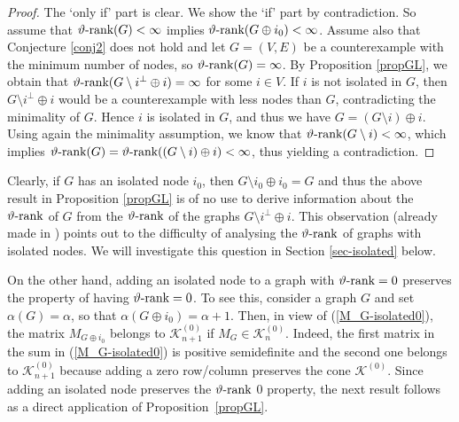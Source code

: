 \documentclass[11pt]{article}
\numberwithin{equation}{section}
\newcommand{\MK}{{\mathcal K}}
\newcommand{\rrank}{\vartheta\text{\rm -rank}}
\begin{document}
\begin{proof}
The `only if' part is clear. We show the `if' part by contradiction. So assume that  $\rrank(G)<\infty$ implies $\rrank(G\oplus i_0)<\infty$. Assume also  that  Conjecture \ref{conj2} does not hold and let $G=(V,E)$ be a counterexample with the minimum number of nodes, so  $\rrank(G)=\infty$. By Proposition \ref{propGL}, we obtain that $\rrank(G\setminus i ^\perp \oplus i)=\infty$ for some $i\in V$. If $i$ is not isolated in $G$, then $G\setminus i^\perp \oplus i$ would be a counterexample with less nodes than $G$,  contradicting the minimality of $G$. Hence $i$ is isolated in $G$, and thus we have $G = (G\setminus i)\oplus i$. Using again the minimality assumption, we know that $\rrank(G\setminus i)<\infty$, which implies   $\rrank(G)=\rrank((G\setminus i)\oplus i)<\infty$, thus yielding a contradiction.
\end{proof}

Clearly,  if $G$ has an isolated node $i_0$,  then $G\setminus {i_0} \oplus i_0=G$ and thus the above result in Proposition \ref{propGL} is of no use to derive information about the $\rrank$ of $G$ from the $\rrank$ of the graphs $G\setminus i^\perp \oplus i $. This observation (already made in \cite{GL2007}) points out to the difficulty of analysing the $\rrank$ of graphs with isolated nodes.  We will investigate this question in Section \ref{sec-isolated} below.

On the other hand, adding an isolated node to  a graph with $\rrank=0$  preserves the property of having $\rrank=0$.  To see this, consider a graph $G$ and set $\alpha(G)=\alpha$, so that $\alpha(G\oplus i_0)=\alpha+1$. 
Then, in view of (\ref{M_G-isolated0}),  the matrix $M_{G\oplus i_0}$ belongs to $\MK_{n+1}^{(0)}$ if $M_G\in \MK_n^{(0)}$. Indeed, the first matrix in the sum in (\ref{M_G-isolated0}) is positive semidefinite and the second one belongs to $\MK_{n+1}^{(0)}$ because adding a zero row/column preserves the cone $\MK^{(0)}$. 
Since adding an isolated node preserves the $\rrank$ 0 property, the next result follows as a direct application of Proposition~\ref{propGL}.
\end{document}
